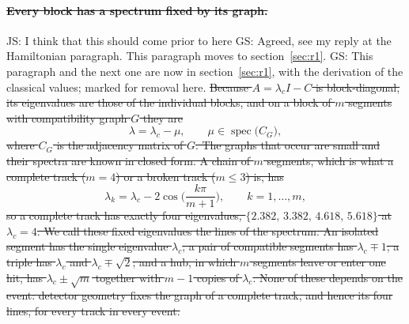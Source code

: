 \documentclass[11pt,a4paper]{article}
\newcommand{\js}[1]{{\color{blue} JS: #1 }}
\newcommand{\gs}[1]{{\color{orange!85!black} GS: #1 }}
\newcommand{\gsx}[1]{{\color{gray}\sout{#1}}}
\newenvironment{gsxblock}{\color{gray}}{}
\begin{document}
\paragraph{\gsx{Every block has a spectrum fixed by its graph.}}
\js{I think that this should come prior to here} \gs{Agreed, see my reply at the Hamiltonian paragraph. This paragraph moves to section~\ref{sec:r1}.}
\gs{This paragraph and the next one are now in section~\mbox{\ref{sec:r1}}, with the derivation of the classical values; marked for removal here.}
\gsx{Because $A=\lambda_cI-C$ is block-diagonal, its eigenvalues are those of the individual blocks, and
on a block of $m$ segments with compatibility graph $G$ they are}
\begin{gsxblock}
\begin{equation*}
\lambda=\lambda_c-\mu,\qquad \mu\in\operatorname{spec}\big(C_G\big),
\end{equation*}
\end{gsxblock}
\gsx{where $C_G$ is the adjacency matrix of $G$. The graphs that occur are small and their spectra are
known in closed form. A chain of $m$ segments, which is what a complete track ($m=4$) or a broken
track ($m\le3$) is, has}
\begin{gsxblock}
\begin{equation*}
\lambda_k=\lambda_c-2\cos\!\Big(\frac{k\pi}{m+1}\Big),\qquad k=1,\dots,m ,
\end{equation*}
\end{gsxblock}
\gsx{so a complete track has exactly four eigenvalues, $\{2.382,\,3.382,\,4.618,\,5.618\}$ at
$\lambda_c=4$. We call these fixed eigenvalues the lines of the spectrum. An isolated segment has the single eigenvalue $\lambda_c$; a pair of compatible
segments has $\lambda_c\mp1$; a triple has $\lambda_c$ and $\lambda_c\mp\sqrt2$; and a hub, in which
$m$ segments leave or enter one hit, has $\lambda_c\pm\sqrt m$ together with $m-1$ copies of
$\lambda_c$. None of these depends on the event: detector geometry fixes the graph of a complete
track, and hence its four lines, for every track in every event.}
\end{document}
